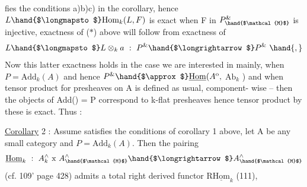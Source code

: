 \margin{\unsure{$\sqcup$}} fies the conditions  a)b)c) in the corollary, hence 
$L \hand{$\longmapsto$} \mathrm{Hom}_k(L,F)$ is exact when F in $P^{\&}_{\hand{$\mathcal{M}$}}$ is injective, exactness of ($\ast$)
above will follow from exactness of
\[ L \hand{$\longmapsto$} L\otimes_k a \ : \ P^{\&} \hand{$\longrightarrow$} P^{\&} \ \hand{,} \]
Now this latter exactness holds in  the case we are interested in
mainly, when $P = \mathrm{Add}_k(A)$ and hence  $P^{\&} \hand{$\approx$} \underline{\mathrm{Hom}}(A^{\mathrm{o}},$ \xout{(}$\mathrm{Ab}_k$ ) and when
tensor product  for presheaves on A is defined as usual, component-%
wise -- then the objects of Add() = P correspond to k-flat presheaves\hand{,}
hence tensor product by these is exact. Thus :

\uline{Corollary} 2 : Assume  satisfies the conditions of corollary 1 above,
let A be any small category and $P = \mathrm{Add}_k(A)$. Then the pairing 
\[ \underline{\mathrm{Hom}}_k \ : \ A^{\wedge}_k \ \mathrm{x}\ A^{\wedge}_{\hand{$\mathcal{M}$}} \hand{$\longrightarrow$} A^{\wedge}_{\hand{$\mathcal{M}$}} \]
(cf. 109' page 428) admits a total right derived functor R$\underline{\mathrm{Hom}}_k$ (111),

